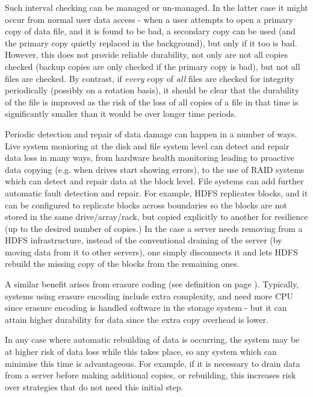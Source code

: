 Such interval checking can be managed or un-managed. In the latter case it might
occur from normal user data access - when a user attempts to open a primary copy
of data file, and it is found to be bad, a secondary copy can be used (and the
primary copy quietly replaced in the background), but only if it too is bad.
However, this does not provide reliable durability, not only are not all copies
checked (backup copies are only checked if the primary copy is bad), but not all
files are checked. By contrast, if \textit{every} copy of \textit{all} files are
checked for integrity periodically (possibly on a rotation basis), it should be
clear that the durability of the file is improved as the risk of the loss of all
copies of a file in that time is significantly smaller than it would be over
longer time periods.

Periodic detection and repair of data damage can happen in a number of ways.
Live system monioring at the disk and file system level can detect and repair
data loss in many ways, from hardware health monitoring leading to proactive
data  copying (e.g. when drives start showing errors), to the use of RAID
systems which can detect and repair data at the block level.  File systems can
add further automatic fault detection and repair. For example, HDFS replicates
blocks, and it can be configured to replicate blocks across boundaries so the
blocks are not stored in the same drive/array/rack, but copied explicitly to
another for resilience (up to the desired number of copies.)  In the case a
server needs removing from a HDFS infrastructure, instead of the conventional
draining of the server (by moving data from it to other servers), one simply
disconnects it and lets HDFS rebuild the missing copy of the blocks from the
remaining ones.

A similar benefit arises from erasure coding (see definition on page \pageref{para:erasure_codes}). Typically, systems using erasure encoding include
extra complexity, and need more CPU since erasure encoding is handled software
in the storage system - but it can attain higher durability for data since the extra copy overhead is lower.

In any case where automatic rebuilding of data is occurring, the system may be at higher risk of data loss while this takes place, so any system which can minimise this time is advantageous. For example, if it is necessary to drain data
from a server before making additional copies, or rebuilding, this increases
risk over strategies that do not need this initial step.

